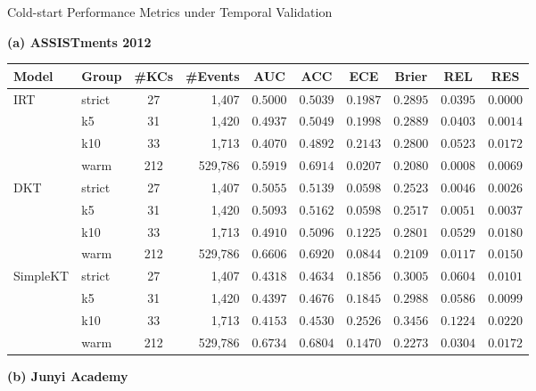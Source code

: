 \begin{tableorg}[htbp]
\caption{Cold-start Performance Metrics under Temporal Validation}
\label{tab:cold_start_temporal}
\centering
\footnotesize
\setlength{\tabcolsep}{3pt}

\textbf{(a) ASSISTments 2012}
\vspace{1ex}

\begin{tabular}{llcrcccccc}
\toprule
Model & Group & \#KCs & \#Events & AUC & ACC & ECE & Brier & REL & RES \\
\midrule
IRT & strict & 27 & 1,407 & $0.5000$ & $0.5039$ & $0.1987$ & $0.2895$ & $0.0395$ & $0.0000$ \\
 & k5 & 31 & 1,420 & $0.4937$ & $0.5049$ & $0.1998$ & $0.2889$ & $0.0403$ & $0.0014$ \\
 & k10 & 33 & 1,713 & $0.4070$ & $0.4892$ & $0.2143$ & $0.2800$ & $0.0523$ & $0.0172$ \\
 & warm & 212 & 529,786 & $0.5919$ & $0.6914$ & $0.0207$ & $0.2080$ & $0.0008$ & $0.0069$ \\
\midrule
DKT & strict & 27 & 1,407 & $0.5055$ & $0.5139$ & $0.0598$ & $0.2523$ & $0.0046$ & $0.0026$ \\
 & k5 & 31 & 1,420 & $0.5093$ & $0.5162$ & $0.0598$ & $0.2517$ & $0.0051$ & $0.0037$ \\
 & k10 & 33 & 1,713 & $0.4910$ & $0.5096$ & $0.1225$ & $0.2801$ & $0.0529$ & $0.0180$ \\
 & warm & 212 & 529,786 & $0.6606$ & $0.6920$ & $0.0844$ & $0.2109$ & $0.0117$ & $0.0150$ \\
\midrule
SimpleKT & strict & 27 & 1,407 & $0.4318$ & $0.4634$ & $0.1856$ & $0.3005$ & $0.0604$ & $0.0101$ \\
 & k5 & 31 & 1,420 & $0.4397$ & $0.4676$ & $0.1845$ & $0.2988$ & $0.0586$ & $0.0099$ \\
 & k10 & 33 & 1,713 & $0.4153$ & $0.4530$ & $0.2526$ & $0.3456$ & $0.1224$ & $0.0220$ \\
 & warm & 212 & 529,786 & $0.6734$ & $0.6804$ & $0.1470$ & $0.2273$ & $0.0304$ & $0.0172$ \\
\bottomrule
\end{tabular}

\vspace{3ex}
\textbf{(b) Junyi Academy}
\vspace{1ex}


\end{tableorg}
